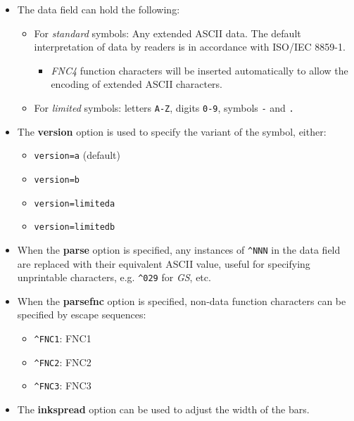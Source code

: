 \begin{itemize}
\tightlist
\item
  The data field can hold the following:

  \begin{itemize}
  \tightlist
  \item
    For \emph{standard} symbols: Any extended ASCII data. The default
    interpretation of data by readers is in accordance with ISO/IEC
    8859-1.

    \begin{itemize}
    \tightlist
    \item
      \emph{FNC4} function characters will be inserted automatically to
      allow the encoding of extended ASCII characters.
    \end{itemize}
  \item
    For \emph{limited} symbols: letters \texttt{A-Z}, digits
    \texttt{0-9}, symbols \texttt{-} and \texttt{.}
  \end{itemize}
\item
  The \textbf{version} option is used to specify the variant of the
  symbol, either:

  \begin{itemize}
  \tightlist
  \item
    \texttt{version=a} (default)
  \item
    \texttt{version=b}
  \item
    \texttt{version=limiteda}
  \item
    \texttt{version=limitedb}
  \end{itemize}
\item
  When the \textbf{parse} option is specified, any instances of
  \texttt{\^{}NNN} in the data field are replaced with their equivalent
  ASCII value, useful for specifying unprintable characters, e.g.
  \texttt{\^{}029} for \emph{GS}, etc.
\item
  When the \textbf{parsefnc} option is specified, non-data function
  characters can be specified by escape sequences:

  \begin{itemize}
  \tightlist
  \item
    \texttt{\^{}FNC1}: FNC1
  \item
    \texttt{\^{}FNC2}: FNC2
  \item
    \texttt{\^{}FNC3}: FNC3
  \end{itemize}
\item
  The \textbf{inkspread} option can be used to adjust the width of the
  bars.
\end{itemize}

